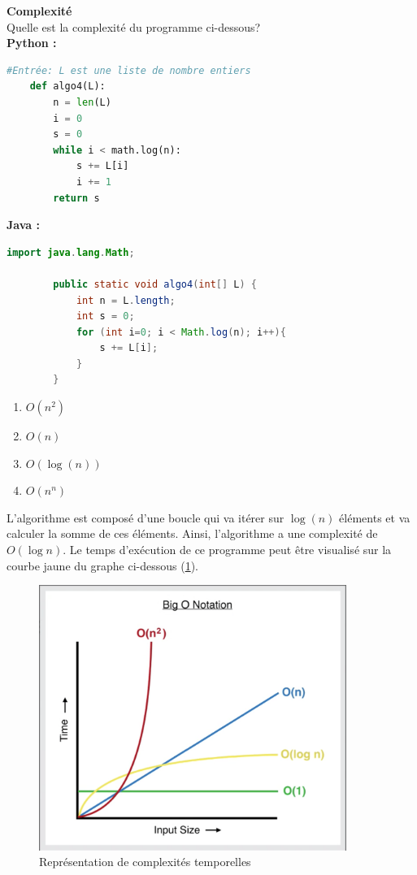 \begin{Exercice}[10 minutes] \textbf{Complexité} \\
    Quelle est la complexité du programme ci-dessous?\\
    \textbf{Python :}
    \begin{lstlisting}[language=Python]
    #Entrée: L est une liste de nombre entiers
    def algo4(L):
        n = len(L)
        i = 0
        s = 0
        while i < math.log(n):
            s += L[i]
            i += 1
        return s
    \end{lstlisting}
    
    \textbf{Java :}
    \begin{lstlisting}[language=Java]
        import java.lang.Math; 

        public static void algo4(int[] L) {
            int n = L.length;
            int s = 0;
            for (int i=0; i < Math.log(n); i++){
                s += L[i];
            }
        }
    \end{lstlisting}

    \begin{enumerate}
        \item $O(n^2)$
        \item $O(n)$
        \item $O(\log(n))$
        \item $O(n^n)$
    \end{enumerate}

    \begin{solution}
    L'algorithme est composé d'une boucle qui va itérer sur $\log(n)$ éléments et 
    va calculer la somme de ces éléments. Ainsi, l'algorithme a une complexité de $O(\log n)$.
    Le temps d'exécution de ce programme peut être visualisé sur la courbe jaune du graphe ci-dessous (\ref{bigO}).
    \end{solution}
    
    \begin{figure}[h!]
        \centering
        \includegraphics[width=10cm]{ressources/complexity.png}
        \caption{Représentation de complexités temporelles}
        \label{bigO}
    \end{figure}

    

\end{Exercice}

